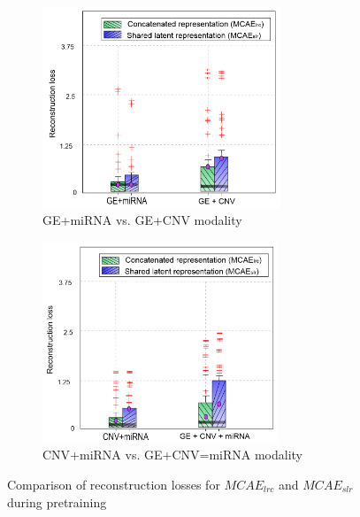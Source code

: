 \begin{figure}[h]
	\centering
	\begin{subfigure}{.48\linewidth}
		\centering
		\includegraphics[width=\linewidth,height=60mm]{images/ce_mcae_1.png}
		\caption{GE+miRNA vs. GE+CNV modality}
        \label{fig:ce_ge_mirna}
	\end{subfigure}
	\begin{subfigure}{0.48\linewidth}
		\centering
		\includegraphics[width=\linewidth,height=60mm]{images/ce_mcae_2.png}
		\caption{CNV+miRNA vs. GE+CNV=miRNA modality}
        \label{fig:ce_ge_cnv}
	\end{subfigure}
	\caption{Comparison of reconstruction losses for $MCAE_{lrc}$ and $MCAE_{slr}$ during pretraining} 
	\label{fig:ce_multimodal_models_1}
\end{figure}

